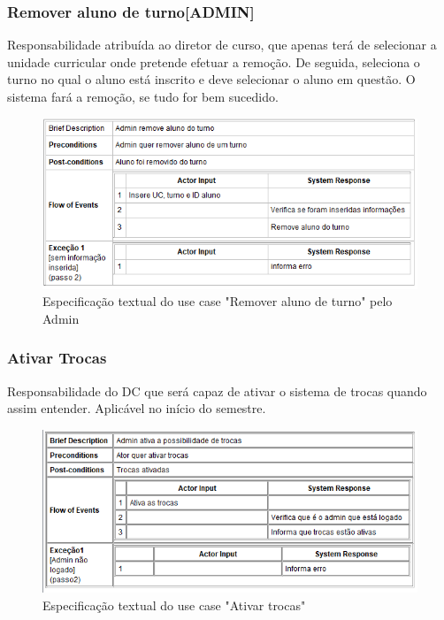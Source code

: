\documentclass[a4paper]{article}
\begin{document}
\clearpage
\subsubsection{Remover aluno de turno[ADMIN]}
\hspace{3mm}Responsabilidade atribuída ao diretor de curso, que apenas terá de selecionar a unidade curricular onde pretende efetuar a remoção. De seguida, seleciona o turno no qual o aluno está inscrito e deve selecionar o aluno em questão. O sistema fará a remoção, se tudo for bem sucedido.

\begin{figure}[H]
\centering
\includegraphics[width=14cm]{UCRemoverAlunoDeTurnoADMIN}
\caption{Especificação textual do use case "Remover aluno de turno" pelo Admin}
\label{}
\end{figure}

\subsubsection{Ativar Trocas}
\hspace{3mm}Responsabilidade do DC que será capaz de ativar o sistema de trocas quando assim entender. Aplicável no início do semestre.

\begin{figure}[H]
\centering
\includegraphics[width=14cm]{UCAtivarTrocasADMIN}
\caption{Especificação textual do use case "Ativar trocas"}
\label{}
\end{figure}
\end{document}
